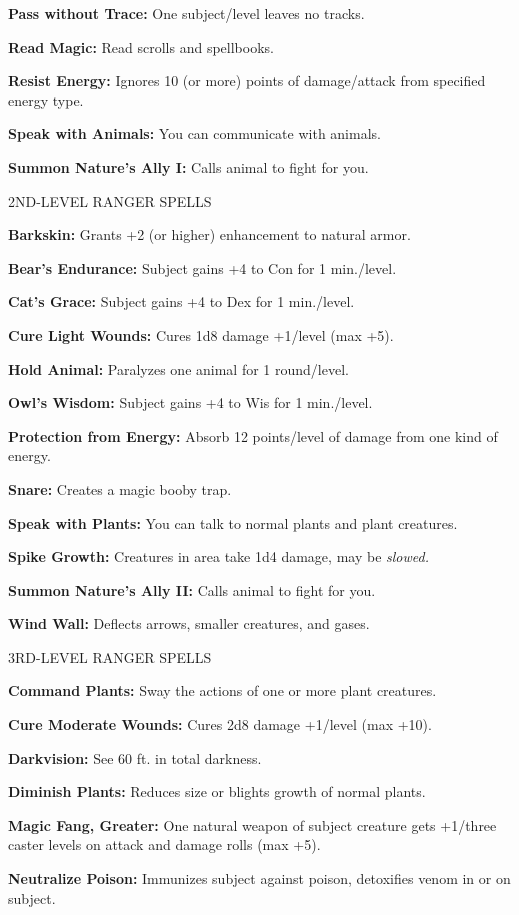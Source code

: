 \documentclass{article}
\begin{document}
\textbf{Pass without Trace:} One subject/level leaves no tracks.

\textbf{Read Magic:} Read scrolls and spellbooks.

\textbf{Resist Energy:} Ignores 10 (or more) points of damage/attack from specified 
energy type.

\textbf{Speak with Animals:} You can communicate with animals.

\textbf{Summon Nature's Ally I:} Calls animal to fight for you.

2ND-LEVEL RANGER SPELLS

\textbf{Barkskin:} Grants +2 (or higher) enhancement to natural armor.

\textbf{Bear's Endurance:} Subject gains +4 to Con for 1 min./level.

\textbf{Cat's Grace:} Subject gains +4 to Dex for 1 min./level.

\textbf{Cure Light Wounds:} Cures 1d8 damage +1/level (max +5).

\textbf{Hold Animal:} Paralyzes one animal for 1 round/level.

\textbf{Owl's Wisdom:} Subject gains +4 to Wis for 1 min./level.

\textbf{Protection from Energy:} Absorb 12 points/level of damage from one kind 
of energy.

\textbf{Snare:} Creates a magic booby trap.

\textbf{Speak with Plants:} You can talk to normal plants and plant creatures.

\textbf{Spike Growth:} Creatures in area take 1d4 damage, may be \textit{slowed.}

\textbf{Summon Nature's Ally II:} Calls animal to fight for you.

\textbf{Wind Wall:} Deflects arrows, smaller creatures, and gases.

3RD-LEVEL RANGER SPELLS

\textbf{Command Plants:} Sway the actions of one or more plant creatures.

\textbf{Cure Moderate Wounds:} Cures 2d8 damage +1/level (max +10).

\textbf{Darkvision:} See 60 ft. in total darkness.

\textbf{Diminish Plants:} Reduces size or blights growth of normal plants.

\textbf{Magic Fang, Greater:} One natural weapon of subject creature gets +1/three 
caster levels on attack and damage rolls (max +5).

\textbf{Neutralize Poison:} Immunizes subject against poison, detoxifies venom 
in or on subject.
\end{document}

